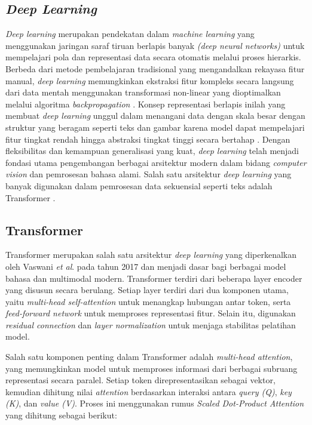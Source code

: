 \subsection{\textit{Deep Learning}} \label{II.teori1}
\textit{Deep learning} merupakan pendekatan dalam \textit{machine learning} yang menggunakan jaringan saraf tiruan berlapis banyak \textit{(deep neural networks)} untuk mempelajari pola dan representasi data secara otomatis melalui proses hierarkis. Berbeda dari metode pembelajaran tradisional yang mengandalkan rekayasa fitur manual, \textit{deep learning} memungkinkan ekstraksi fitur kompleks secara langsung dari data mentah menggunakan transformasi non-linear yang dioptimalkan melalui algoritma \textit{backpropagation} \cite{lecun2015deep}. Konsep representasi berlapis inilah yang membuat \textit{deep learning} unggul dalam menangani data dengan skala besar dengan struktur yang beragam seperti teks dan gambar karena model dapat mempelajari fitur tingkat rendah hingga abstraksi tingkat tinggi secara bertahap \cite{schmidhuber2015deep}. Dengan fleksibilitas dan kemampuan generalisasi yang kuat, \textit{deep learning} telah menjadi fondasi utama pengembangan berbagai arsitektur modern dalam bidang \textit{computer vision} dan pemrosesan bahasa alami. Salah satu arsitektur \textit{deep learning} yang banyak digunakan dalam pemrosesan data sekuensial seperti teks adalah Transformer \cite{Hakim2025DeteksiBeritaPalsu}.


\subsection{Transformer} \label{II.teori4}
Transformer merupakan salah satu arsitektur \textit{deep learning} yang diperkenalkan oleh Vaswani \textit{et al}. pada tahun 2017 dan menjadi dasar bagi berbagai model bahasa dan multimodal modern. Transformer terdiri dari beberapa layer encoder yang disusun secara berulang. Setiap layer terdiri dari dua komponen utama, yaitu \textit{multi-head self-attention} untuk menangkap hubungan antar token, serta \textit{feed-forward network} untuk memproses representasi fitur. Selain itu, digunakan \textit{residual connection} dan \textit{layer normalization} untuk menjaga stabilitas pelatihan model.

Salah satu komponen penting dalam Transformer adalah \textit{multi-head attention}, yang memungkinkan model untuk memproses informasi dari berbagai subruang representasi secara paralel. Setiap token direpresentasikan sebagai vektor, kemudian dihitung nilai \textit{attention} berdasarkan interaksi antara \textit{query (Q)}, \textit{key (K)}, dan \textit{value (V)}. Proses ini menggunakan rumus \textit{Scaled Dot-Product Attention} yang dihitung sebagai berikut:

